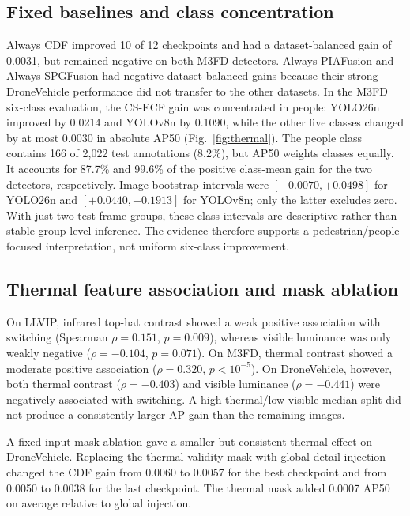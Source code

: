 \documentclass[preprint,11pt]{elsarticle}
\begin{document}
\subsection{Fixed baselines and class concentration}

Always CDF improved 10 of 12 checkpoints and had a dataset-balanced gain of
0.0031, but remained negative on both M3FD detectors. Always PIAFusion and
Always SPGFusion had negative dataset-balanced gains because their strong
DroneVehicle performance did not transfer to the other datasets. In the M3FD
six-class evaluation, the CS-ECF gain was concentrated in people:
YOLO26n improved by 0.0214 and YOLOv8n by 0.1090, while the other five classes
changed by at most 0.0030 in absolute AP50 (Fig.~\ref{fig:thermal}). The people
class contains 166 of 2,022 test annotations (8.2\%), but AP50 weights classes
equally. It accounts for 87.7\% and 99.6\% of the positive class-mean gain for
the two detectors, respectively. Image-bootstrap intervals were
\([-0.0070,+0.0498]\) for YOLO26n and \([+0.0440,+0.1913]\) for YOLOv8n; only
the latter excludes zero. With just two test frame groups, these class
intervals are descriptive rather than stable group-level inference. The
evidence therefore supports a pedestrian/people-focused interpretation, not
uniform six-class improvement.

\subsection{Thermal feature association and mask ablation}

On LLVIP, infrared top-hat contrast showed a weak positive association with
switching (Spearman \(\rho=0.151\), \(p=0.009\)), whereas visible luminance was
only weakly negative (\(\rho=-0.104\), \(p=0.071\)). On M3FD, thermal contrast
showed a moderate positive association (\(\rho=0.320\), \(p<10^{-5}\)).
On DroneVehicle, however, both thermal contrast (\(\rho=-0.403\)) and visible
luminance (\(\rho=-0.441\)) were negatively associated with switching. A
high-thermal/low-visible median split did not produce a consistently larger AP
gain than the remaining images.

A fixed-input mask ablation gave a smaller but consistent thermal effect on
DroneVehicle. Replacing the thermal-validity mask with global detail injection
changed the CDF gain from 0.0060 to 0.0057 for the best checkpoint and from
0.0050 to 0.0038 for the last checkpoint. The thermal mask added 0.0007 AP50 on
average relative to global injection.
\end{document}

